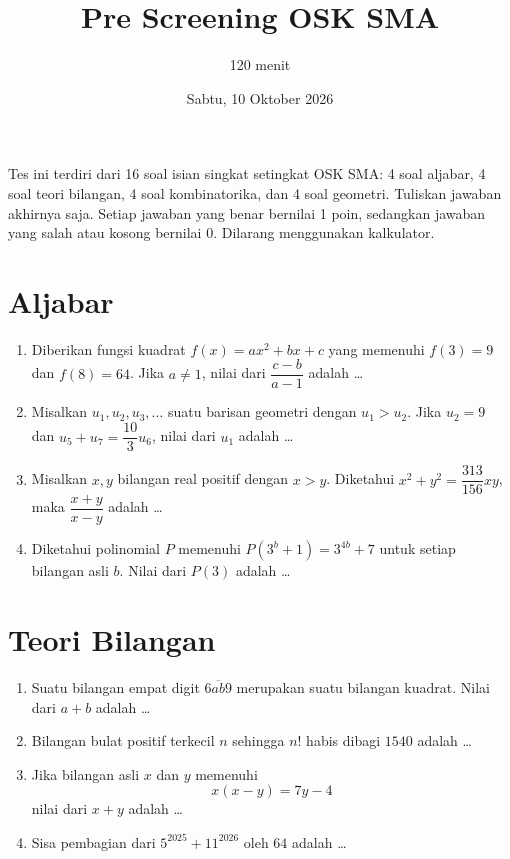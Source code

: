 \documentclass[12pt]{scrartcl}
\title{Pre Screening OSK SMA}
\author{120 menit}
\date{Sabtu, 10 Oktober 2026}
\begin{document}
\maketitle

\renewcommand*\contentsname{Daftar Isi}
\tableofcontents

\newpage

\noindent Tes ini terdiri dari 16 soal isian singkat setingkat OSK SMA:
4 soal aljabar, 4 soal teori bilangan, 4 soal kombinatorika, dan 4 soal geometri.
Tuliskan jawaban akhirnya saja. Setiap jawaban yang benar bernilai 1 poin,
sedangkan jawaban yang salah atau kosong bernilai 0. Dilarang menggunakan kalkulator.

\section{Aljabar}
\begin{enumerate}
	\item Diberikan fungsi kuadrat $f(x)=ax^{2}+bx+c$ yang memenuhi $f(3)=9$ dan $f(8)=64$.
	Jika $a \ne 1$, nilai dari $\dfrac{c-b}{a-1}$ adalah \dots

	\item Misalkan $u_{1},u_{2},u_{3},\dots$ suatu barisan geometri dengan $u_{1}>u_{2}$.
	Jika $u_{2}=9$ dan $u_{5}+u_{7}=\dfrac{10}{3}u_{6}$, nilai dari $u_{1}$ adalah \dots

	\item Misalkan $x, y$ bilangan real positif dengan $x>y$.
	Diketahui $x^{2}+y^{2}=\dfrac{313}{156}xy$, maka $\dfrac{x+y}{x-y}$ adalah \dots

	\item Diketahui polinomial $P$ memenuhi $P(3^{b}+1)=3^{4b}+7$ untuk setiap bilangan asli $b$.
	Nilai dari $P(3)$ adalah \dots
\end{enumerate}

\section{Teori Bilangan}
\begin{enumerate}[resume]
	\item Suatu bilangan empat digit $\overline{6ab9}$ merupakan suatu bilangan kuadrat.
	Nilai dari $a+b$ adalah \dots

	\item Bilangan bulat positif terkecil $n$ sehingga $n!$ habis dibagi $1540$ adalah \dots

	\item Jika bilangan asli $x$ dan $y$ memenuhi
	\[ x(x-y)=7y-4 \]
	nilai dari $x+y$ adalah \dots

	\item Sisa pembagian dari $5^{2025}+11^{2026}$ oleh $64$ adalah \dots
\end{enumerate}
\end{document}
